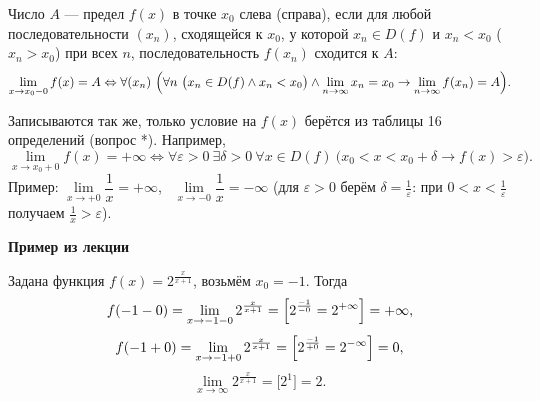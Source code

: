 \documentclass[a4paper,11pt]{article}
\newcommand{\eps}{\varepsilon}
\newcommand{\podr}[1]{\par\needspace{8\baselineskip}\medskip
  {\large\bfseries\textcolor{oprc!80!black}{#1}}\par\nopagebreak\smallskip}
\begin{document}
\begin{dop}
Число $A$ --- предел $f(x)$ в точке $x_0$ слева (справа), если для любой последовательности $(x_n)$, сходящейся к $x_0$,
у которой $x_n \in D(f)$ и $x_n < x_0$ ($x_n > x_0$) при всех $n$, последовательность $f(x_n)$ сходится к $A$:
\[
  \lim_{x \to x_0 - 0} f(x) = A \Leftrightarrow
  \forall (x_n)\ \Bigl( \forall n\ \bigl(x_n \in D(f) \wedge x_n < x_0\bigr) \wedge \lim_{n \to \infty} x_n = x_0
  \to \lim_{n \to \infty} f(x_n) = A \Bigr).
\]
\end{dop}

\begin{dop}
Записываются так же, только условие на $f(x)$ берётся из таблицы 16 определений (вопрос *). Например,
\[
  \lim_{x \to x_0 + 0} f(x) = +\infty \Leftrightarrow \forall \eps > 0\ \exists \delta > 0\
  \forall x \in D(f)\ \bigl( x_0 < x < x_0 + \delta \to f(x) > \eps \bigr).
\]
Пример: $\lim\limits_{x \to +0} \dfrac{1}{x} = +\infty$, \ $\lim\limits_{x \to -0} \dfrac{1}{x} = -\infty$
(для $\eps > 0$ берём $\delta = \frac1\eps$: при $0 < x < \frac1\eps$ получаем $\frac1x > \eps$).
\end{dop}

\podr{Пример из лекции}

Задана функция $f(x) = 2^{\frac{x}{x + 1}}$, возьмём $x_0 = -1$. Тогда
\[
  f(-1 - 0) = \lim_{x \to -1 - 0} 2^{\frac{x}{x + 1}} = \Bigl[ 2^{\frac{-1}{-0}} = 2^{+\infty} \Bigr] = +\infty,
\]
\[
  f(-1 + 0) = \lim_{x \to -1 + 0} 2^{\frac{x}{x + 1}} = \Bigl[ 2^{\frac{-1}{+0}} = 2^{-\infty} \Bigr] = 0,
\]
\[
  \lim_{x \to \infty} 2^{\frac{x}{x + 1}} = \bigl[ 2^1 \bigr] = 2.
\]

\begin{center}
\end{center}
\end{document}
